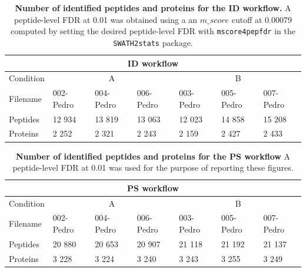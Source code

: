 \documentclass[11pt]{article}
\begin{document}
\begin{table}[h]
    \begin{tabular}{l|lll|lll}
    \hline
    \multicolumn{7}{c}{ID workflow} \\ \hline
    Condition & \multicolumn{3}{c|}{A} & \multicolumn{3}{c}{B}\\
    \hline
    Filename       & 002-Pedro & 004-Pedro & 006-Pedro & 003-Pedro & 005-Pedro & 007-Pedro \\
    \hline
    Peptides  & 12 934                        & 13 819                        & 13 063                        & 12 023                        & 14 858                        & 15 208                        \\
    Proteins  & 2 252                         & 2 321                         & 2 243                         & 2 159                         & 2 427                         & 2 433                         \\ \hline
    \end{tabular}
     \caption{{\bf Number of identified peptides and proteins for the ID workflow.} A peptide-level FDR at 0.01 was obtained using a an $m\_score$ cutoff at 0.00079 computed by setting the desired peptide-level FDR with \texttt{mscore4pepfdr} in the \texttt{SWATH2stats} package.
          \label{fig:osw_peptide_and_protein_id}}
\end{table}
        

\begin{table}[h]
    \begin{tabular}{l|lll|lll}
    \hline
    \multicolumn{7}{c}{PS workflow}                                                                                                                                                                                   \\ \hline
    Condition & \multicolumn{3}{c|}{A}                                                                         & \multicolumn{3}{c}{B}                                                                         \\
    \hline
    Filename       & 002-Pedro & 004-Pedro & 006-Pedro & 003-Pedro & 005-Pedro & 007-Pedro \\
    \hline
    Peptides  & 20 880                        & 20 653                        & 20 907                        & 21 118                        & 21 192                        & 21 137                        \\
    Proteins  & 3 228                         & 3 224                         & 3 240                         & 3 243                         & 3 255                         & 3 249                         \\ \hline
    \end{tabular}
     \caption{{\bf Number of identified peptides and proteins for the PS workflow} A peptide-level FDR at 0.01 was used for the purpose of reporting these figures.
          \label{fig:diann_peptide_and_protein_id}}
\end{table}
\end{document}

